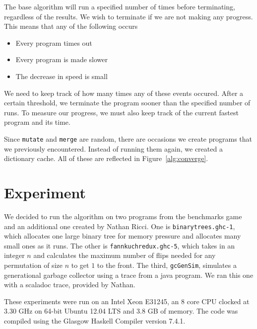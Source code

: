\documentclass[preprint,nocopyrightspace]{sigplanconf}
\begin{document}
The base algorithm will run a specified number of times before terminating, regardless of the results. We wish to terminate if we are not making any progress. This means that any of the following occurs
\begin{itemize}
\item Every program times out
\item Every program is made slower
\item The decrease in speed is small
\end{itemize}
We need to keep track of how many times any of these events occured. After a certain threshold, we terminate the program sooner than the specified number of runs. To measure our progress, we must also keep track of the current fastest program and its time.

Since \lstinline!mutate! and \lstinline!merge! are random, there are occasions we create programs that we previously encountered. Instead of running them again, we created a dictionary cache. All of these are reflected in Figure~\ref{alg:converge}.
\section{Experiment}\label{sec:expr}
We decided to run the algorithm on two programs from the benchmarks game~\cite{bgames} and an additional one created by Nathan Ricci. One is \lstinline!binarytrees.ghc-1!, which allocates one large binary tree for memory pressure and allocates many small ones as it runs. The other is \lstinline!fannkuchredux.ghc-5!, which takes in an integer $n$ and calculates the maximum number of flips needed for any permutation of size $n$ to get $1$ to the front. The third, \lstinline!gcGenSim!, simulates a generational garbage collector using a trace from a java program. We ran this one with a scaladoc trace, provided by Nathan.

These experiments were run on an Intel Xeon E31245, an 8 core CPU clocked at 3.30 GHz on 64-bit Ubuntu 12.04 LTS and 3.8 GB of memory. The code was compiled using the Glasgow Haskell Compiler version 7.4.1.

\end{document}
